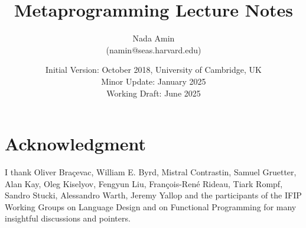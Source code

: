 \documentclass{book}
\begin{document}
%
\setcounter{chapter}{-1}

\title{Metaprogramming Lecture Notes}
\author{Nada Amin\\(namin@seas.harvard.edu)}
\date{Initial Version: October 2018, University of Cambridge, UK\\
Minor Update: January 2025\\
Working Draft: June 2025
}
\maketitle

\tableofcontents







\nocite{sicp}

\chapter*{Acknowledgment}

I thank Oliver Bra\c{c}evac, William E. Byrd, Mistral Contrastin,
Samuel Gruetter, Alan Kay, Oleg Kiselyov, Fengyun Liu,
Fran\c{c}ois-Ren\'e Rideau, Tiark Rompf, Sandro Stucki, Alessandro
Warth, Jeremy Yallop and the participants of the IFIP Working Groups
on Language Design and on Functional Programming for many insightful
discussions and pointers.

\clearpage


\end{document}
